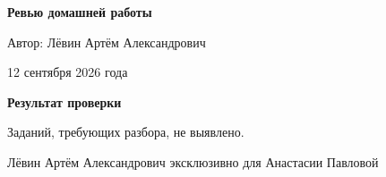 \documentclass[12pt,a4paper]{article}
\begin{document}
\begin{titlepage}
\centering
\vspace*{0.24\textheight}

{\LARGE\bfseries Ревью домашней работы\par}
\vspace{18mm}
{\large Автор: Лёвин Артём Александрович\par}
\vspace{7mm}
{\large 12 сентября 2026 года\par}

\vfill
{}
\vspace*{8mm}
\end{titlepage}

\newpage
\thispagestyle{empty}
\vspace*{0.34\textheight}
\begin{center}
{\Large\bfseries Результат проверки}\par
\vspace{12mm}
{\large Заданий, требующих разбора, не выявлено.}
\end{center}

\vfill
\begin{center}
\small Лёвин Артём Александрович эксклюзивно для Анастасии Павловой
\end{center}
\end{document}
